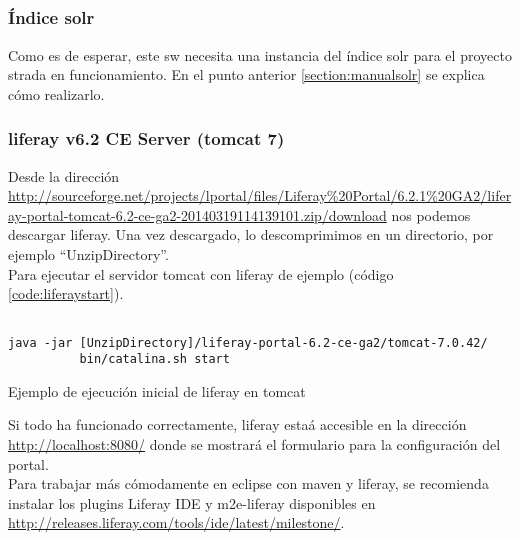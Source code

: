 \subsection{}

\subsubsection{Índice \gls{solr}}
Como es de esperar, este \gls{sw} necesita una instancia del índice \gls{solr} para el proyecto \gls{strada} en funcionamiento. En el punto anterior \ref{section:manualsolr} se explica cómo realizarlo.

\subsubsection{\Gls{liferay} v6.2 CE Server (\gls{tomcat} 7)}
\label{subsubsection:reqliferay}
Desde la dirección \url{http://sourceforge.net/projects/lportal/files/Liferay\%20Portal/6.2.1\%20GA2/liferay-portal-tomcat-6.2-ce-ga2-20140319114139101.zip/download} nos podemos descargar \gls{liferay}. Una vez descargado, lo descomprimimos en un directorio, por ejemplo ``UnzipDirectory''.\\

Para ejecutar el servidor \gls{tomcat} con \gls{liferay} de ejemplo (código \ref{code:liferaystart}).\\
\begin{listing}[H]
    \begin{verbatim}
               
java -jar [UnzipDirectory]/liferay-portal-6.2-ce-ga2/tomcat-7.0.42/
		  bin/catalina.sh start
    \end{verbatim}
    \caption{Ejemplo de ejecución inicial de \gls{liferay} en \gls{tomcat}}
    \label{code:liferaystart}
\end{listing}

Si todo ha funcionado correctamente, \gls{liferay} estaá accesible en la dirección \url{http://localhost:8080/} donde se mostrará el formulario para la configuración del portal.\\

Para trabajar más cómodamente en \gls{eclipse} con \gls{maven} y \gls{liferay}, se recomienda instalar los \glspl{plugin} Liferay IDE y m2e-liferay disponibles en \url{http://releases.liferay.com/tools/ide/latest/milestone/}.

